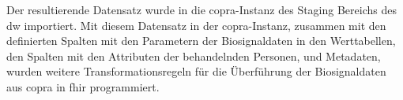 Der resultierende Datensatz wurde in die \ac{copra}-Instanz des Staging Bereichs des \ac{dw} importiert. Mit diesem Datensatz in der \ac{copra}-Instanz, zusammen mit den definierten Spalten mit den Parametern der Biosignaldaten in den Werttabellen, den Spalten mit den Attributen der behandelnden Personen, und Metadaten, wurden weitere Transformationsregeln für die Überführung der Biosignaldaten aus \ac{copra} in \ac{fhir} programmiert.